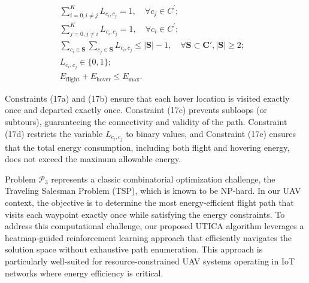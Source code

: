 \documentclass[sigconf]{acmart}
\begin{document}
\begin{subequations} 
\begin{align}
    & \sum_{i=0,i\neq j}^K L_{c_i,c_j} = 1, \quad \forall c_j\in C^{\prime};  && \label{eq:P3a} \tag{17a} \\
    & \sum_{j=0,j\neq i}^K L_{c_i,c_j} = 1, \quad \forall c_i\in C^{\prime};  && \label{eq:P3b} \tag{17b} \\
    & \sum_{c_{i}\in\boldsymbol{S}}\sum_{c_{j}\in\boldsymbol{S}} L_{c_{i},c_{j}} \leq |\boldsymbol{S}|-1, \quad \forall \boldsymbol{S} \subset \boldsymbol{C'}, |\boldsymbol{S}|\geq2;  && \label{eq:P3c} \tag{17c} \\
    & L_{c_{i},c_{j}} \in \{0,1\};  && \label{eq:P3d} \tag{17d} \\
    & E_{\mathrm{flight}} + E_{\mathrm{hover}} \leq E_{\mathrm{max}}.  && \label{eq:P3e} \tag{17e}
\end{align}
\end{subequations}
\setcounter{equation}{17}

Constraints (17a) and (17b) ensure that each hover location is visited exactly once and departed exactly once. Constraint (17c) prevents subloops (or subtours), guaranteeing the connectivity and validity of the path. Constraint (17d) restricts the variable $L_{c_i,c_j}$ to binary values, and Constraint (17e) ensures that the total energy consumption, including both flight and hovering energy, does not exceed the maximum allowable energy. 

Problem $\mathcal{P}_3$ represents a classic combinatorial optimization challenge, the Traveling Salesman Problem (TSP), which is known to be NP-hard. In our UAV context, the objective is to determine the most energy-efficient flight path that visits each waypoint exactly once while satisfying the energy constraints. To address this computational challenge, our proposed UTICA algorithm leverages a heatmap-guided reinforcement learning approach that efficiently navigates the solution space without exhaustive path enumeration. This approach is particularly well-suited for resource-constrained UAV systems operating in IoT networks where energy efficiency is critical.
\end{document}
